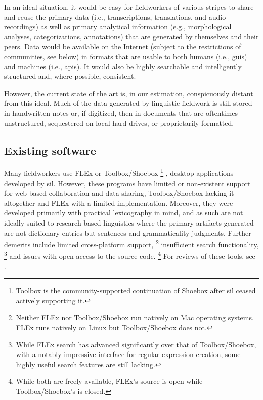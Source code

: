 \documentclass[11pt]{article}
\begin{document}
In an ideal situation, it would be easy for fieldworkers of various stripes to
share and reuse the primary data (i.e., transcriptions, translations, and audio
recordings) as well as primary analytical information (e.g., morphological
analyses, categorizations, annotations) that are generated by themselves and
their peers. Data would be available on the Internet (subject to the
restrictions of communities, see below) in formats that are usable to both
humans (i.e., \glspl{gui}) and machines (i.e., \glspl{api}). It would also be
highly searchable and intelligently structured and, where possible, consistent.

However, the current state of the art is, in our estimation, conspicuously
distant from this ideal. Much of the data generated by linguistic fieldwork is
still stored in handwritten notes or, if digitized, then in documents that are
oftentimes unstructured, sequestered on local hard drives, or proprietarily
formatted.


\subsection{Existing software}

Many fieldworkers use FLEx \cite{sil-flex} or Toolbox/Shoebox%
\footnote{Toolbox is the community-supported continuation of Shoebox after
    \gls{sil} ceased actively supporting it.} %
\cite{sil-toolbox-info}, desktop applications developed by \gls{sil}. However,
these programs have limited or non-existent support for web-based collaboration
and data-sharing, Toolbox/Shoebox lacking it altogether and FLEx with a limited
implementation.  Moreover, they were developed primarily with practical
lexicography in mind, and as such are not ideally suited to research-based
linguistics where the primary artifacts generated are not dictionary entries
but sentences and grammaticality judgments. Further demerits include limited
cross-platform support,%
\footnote{Neither FLEx nor Toolbox/Shoebox run natively on Mac operating
    systems. FLEx runs natively on Linux but Toolbox/Shoebox does not.} %
insufficient search functionality,%
\footnote{While FLEx search has advanced significantly over that of
    Toolbox/Shoebox, with a notably impressive interface for regular expression
    creation, some highly useful search features are still lacking.} %
and issues with open access to the source code.%
\footnote{While both are freely available, FLEx's source is open while
Toolbox/Shoebox's is closed.} %
For reviews of these tools, see \cite{Butler:2007,rogers10,robinson07}.
\end{document}
